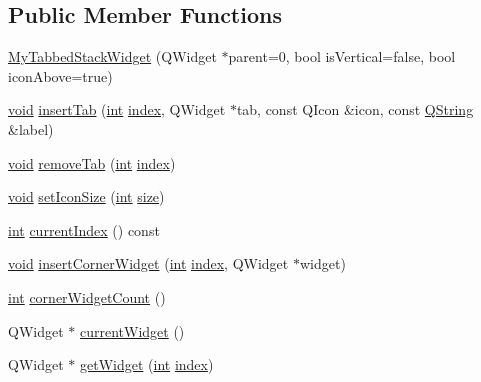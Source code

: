 \subsection*{Public Member Functions}
\begin{DoxyCompactItemize}
\item 
\hyperlink{class_my_tabbed_stack_widget_a45f38b17b9cbdb32460e12c2ccfd5bc5}{My\-Tabbed\-Stack\-Widget} (Q\-Widget $\ast$parent=0, bool is\-Vertical=false, bool icon\-Above=true)
\item 
\hyperlink{group___u_a_v_objects_plugin_ga444cf2ff3f0ecbe028adce838d373f5c}{void} \hyperlink{class_my_tabbed_stack_widget_a6658d23fb4e0f3ae7324b313f5a7b062}{insert\-Tab} (\hyperlink{ioapi_8h_a787fa3cf048117ba7123753c1e74fcd6}{int} \hyperlink{glext_8h_ab47dd9958bcadea08866b42bf358e95e}{index}, Q\-Widget $\ast$tab, const Q\-Icon \&icon, const \hyperlink{group___u_a_v_objects_plugin_gab9d252f49c333c94a72f97ce3105a32d}{Q\-String} \&label)
\item 
\hyperlink{group___u_a_v_objects_plugin_ga444cf2ff3f0ecbe028adce838d373f5c}{void} \hyperlink{class_my_tabbed_stack_widget_a2c275028a87ba60b343b6da3fa21db5a}{remove\-Tab} (\hyperlink{ioapi_8h_a787fa3cf048117ba7123753c1e74fcd6}{int} \hyperlink{glext_8h_ab47dd9958bcadea08866b42bf358e95e}{index})
\item 
\hyperlink{group___u_a_v_objects_plugin_ga444cf2ff3f0ecbe028adce838d373f5c}{void} \hyperlink{class_my_tabbed_stack_widget_adb5bf6edcd958fc360a1c8ac429c7a9d}{set\-Icon\-Size} (\hyperlink{ioapi_8h_a787fa3cf048117ba7123753c1e74fcd6}{int} \hyperlink{glext_8h_a014d89bd76f74ef3a29c8f04b473eb76}{size})
\item 
\hyperlink{ioapi_8h_a787fa3cf048117ba7123753c1e74fcd6}{int} \hyperlink{class_my_tabbed_stack_widget_a791fd756fe24cbd0e0334335701915e1}{current\-Index} () const 
\item 
\hyperlink{group___u_a_v_objects_plugin_ga444cf2ff3f0ecbe028adce838d373f5c}{void} \hyperlink{class_my_tabbed_stack_widget_a5657f3b6910b0335c8d6fa78e98caa09}{insert\-Corner\-Widget} (\hyperlink{ioapi_8h_a787fa3cf048117ba7123753c1e74fcd6}{int} \hyperlink{glext_8h_ab47dd9958bcadea08866b42bf358e95e}{index}, Q\-Widget $\ast$widget)
\item 
\hyperlink{ioapi_8h_a787fa3cf048117ba7123753c1e74fcd6}{int} \hyperlink{class_my_tabbed_stack_widget_a669cd92d77d9616b4526c7cf1abfa2a5}{corner\-Widget\-Count} ()
\item 
Q\-Widget $\ast$ \hyperlink{class_my_tabbed_stack_widget_a54de7410a5b308e2ea32fe95da7a1ed9}{current\-Widget} ()
\item 
Q\-Widget $\ast$ \hyperlink{class_my_tabbed_stack_widget_a26d2df6637c94d03f943b431557f647c}{get\-Widget} (\hyperlink{ioapi_8h_a787fa3cf048117ba7123753c1e74fcd6}{int} \hyperlink{glext_8h_ab47dd9958bcadea08866b42bf358e95e}{index})
\end{DoxyCompactItemize}



